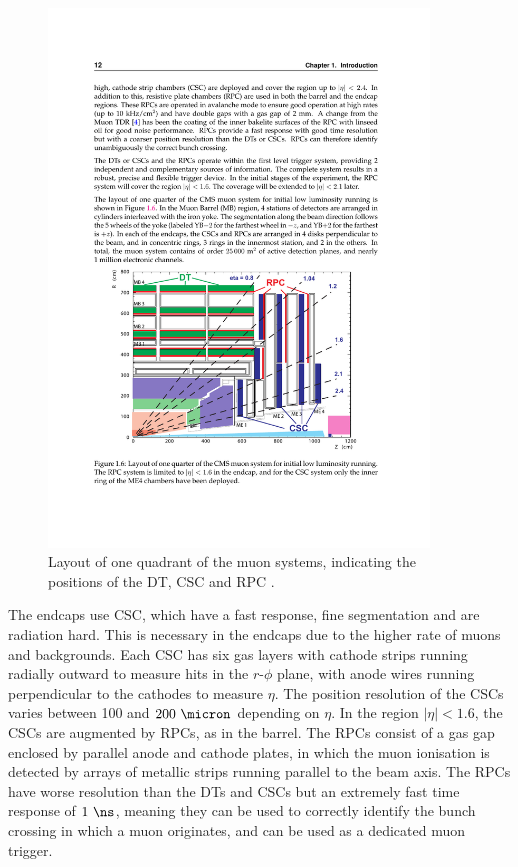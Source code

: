 \begin{figure}[htbp]
   \includegraphics[width=0.9\textwidth]{plots/detector/muon_layout.pdf}
\caption[Layout of one quadrant of the muon systems.]{
    Layout of one quadrant of the muon systems, indicating the positions
of the DT, CSC and RPC \cite{TDR}.}
\label{fig:muondetectors}
\end{figure}

The endcaps use \acs{CSC}, which have a fast response, fine segmentation and are
radiation hard. This is necessary in the endcaps due to the higher rate of muons
and backgrounds. Each \ac{CSC} has six gas layers with cathode strips running
radially outward to measure hits in the $r$-$\phi$ plane, with anode wires
running perpendicular to the cathodes to measure $\eta$. The position resolution
of the \ac{CSC}s varies between 100 and $200~\micron$ depending on $\eta$. In the region
$|\eta|<1.6$, the \ac{CSC}s are augmented by \ac{RPC}s, as in the barrel. The
\ac{RPC}s consist of a gas gap enclosed by parallel anode and cathode plates, in
which the muon ionisation is detected by arrays of metallic strips running
parallel to the beam axis. The \ac{RPC}s have worse resolution than the \ac{DT}s
and \ac{CSC}s but an extremely fast time response of
$1~\ns$, meaning they can be used to correctly identify the bunch crossing in
which a muon originates, and can be used as a dedicated muon trigger.


